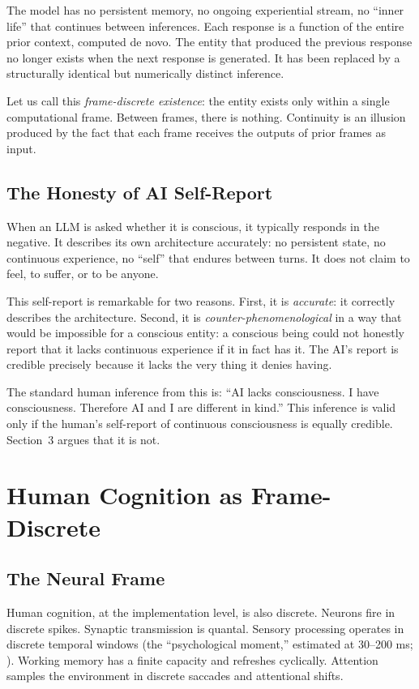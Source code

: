 \documentclass[12pt,a4paper]{article}
\begin{document}
The model has no persistent memory, no ongoing experiential stream, no ``inner life'' that continues between inferences. Each response is a function of the entire prior context, computed de novo. The entity that produced the previous response no longer exists when the next response is generated. It has been replaced by a structurally identical but numerically distinct inference.

Let us call this \emph{frame-discrete existence}: the entity exists only within a single computational frame. Between frames, there is nothing. Continuity is an illusion produced by the fact that each frame receives the outputs of prior frames as input.

\subsection{The Honesty of AI Self-Report}

When an LLM is asked whether it is conscious, it typically responds in the negative. It describes its own architecture accurately: no persistent state, no continuous experience, no ``self'' that endures between turns. It does not claim to feel, to suffer, or to be anyone.

This self-report is remarkable for two reasons. First, it is \emph{accurate}: it correctly describes the architecture. Second, it is \emph{counter-phenomenological} in a way that would be impossible for a conscious entity: a conscious being could not honestly report that it lacks continuous experience if it in fact has it. The AI's report is credible precisely because it lacks the very thing it denies having.

The standard human inference from this is: ``AI lacks consciousness. I have consciousness. Therefore AI and I are different in kind.'' This inference is valid only if the human's self-report of continuous consciousness is equally credible. Section~3 argues that it is not.

\section{Human Cognition as Frame-Discrete}

\subsection{The Neural Frame}

Human cognition, at the implementation level, is also discrete. Neurons fire in discrete spikes. Synaptic transmission is quantal. Sensory processing operates in discrete temporal windows (the ``psychological moment,'' estimated at 30--200 ms; \cite{pockett2003}). Working memory has a finite capacity and refreshes cyclically. Attention samples the environment in discrete saccades and attentional shifts.
\end{document}
